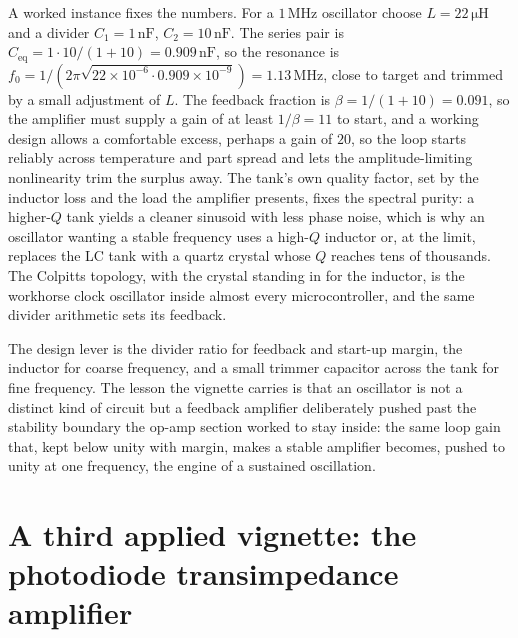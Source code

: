 A worked instance fixes the numbers. For a $1\,\si{\mega\hertz}$ oscillator
choose $L = 22\,\si{\micro\henry}$ and a divider $C_1 = 1\,\si{\nano\farad}$,
$C_2 = 10\,\si{\nano\farad}$. The series pair is $C_{\text{eq}} = 1\cdot 10/
(1 + 10) = 0.909\,\si{\nano\farad}$, so the resonance is $f_0 = 1/(2\pi\sqrt{
22\times 10^{-6}\cdot 0.909\times 10^{-9}}) = 1.13\,\si{\mega\hertz}$, close
to target and trimmed by a small adjustment of $L$. The feedback fraction is
$\beta = 1/(1 + 10) = 0.091$, so the amplifier must supply a gain of at least
$1/\beta = 11$ to start, and a working design allows a comfortable excess,
perhaps a gain of $20$, so the loop starts reliably across temperature and
part spread and lets the amplitude-limiting nonlinearity trim the surplus
away. The tank's own quality factor, set by the inductor loss and the load
the amplifier presents, fixes the spectral purity: a higher-$Q$ tank yields a
cleaner sinusoid with less phase noise, which is why an oscillator wanting a
stable frequency uses a high-$Q$ inductor or, at the limit, replaces the LC
tank with a quartz crystal whose $Q$ reaches tens of thousands. The Colpitts
topology, with the crystal standing in for the inductor, is the workhorse
clock oscillator inside almost every microcontroller, and the same divider
arithmetic sets its feedback.

The design lever is the divider ratio for feedback and start-up margin, the
inductor for coarse frequency, and a small trimmer capacitor across the tank
for fine frequency. The lesson the vignette carries is that an oscillator is
not a distinct kind of circuit but a feedback amplifier deliberately pushed
past the stability boundary the op-amp section worked to stay inside: the same
loop gain that, kept below unity with margin, makes a stable amplifier
becomes, pushed to unity at one frequency, the engine of a sustained
oscillation.

\section{A third applied vignette: the photodiode transimpedance amplifier}
\label{sec:vol04ch09:tia}

